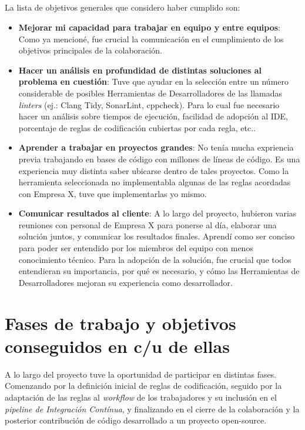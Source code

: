 \documentclass[12pt]{extreport} %
\begin{document}
\paragraph{}
La lista de objetivos generales que considero haber cumplido son:
\begin{itemize}
\item \textbf{Mejorar mi capacidad para trabajar en equipo y entre
  equipos}: Como ya mencioné, fue crucial la comunicación en el
  cumplimiento de los objetivos principales de la colaboración.
\item \textbf{Hacer un análisis en profundidad de distintas soluciones
  al problema en cuestión}: Tuve que ayudar en la selección entre un
  número considerable de posibles Herramientas de Desarrolladores de
  las llamadas \emph{linters} (ej.: Clang Tidy, SonarLint,
  cppcheck). Para lo cual fue necesario hacer un análisis sobre
  tiempos de ejecución, facilidad de adopción al IDE, porcentaje de
  reglas de codificación cubiertas por cada regla, etc..
\item \textbf{Aprender a trabajar en proyectos grandes}: No tenía
  mucha expriencia previa trabajando en bases de código con millones
  de líneas de código. Es una experiencia muy distinta saber ubicarse
  dentro de tales proyectos. Como la herramienta seleccionada no
  implementabla algunas de las reglas acordadas con Empresa X, tuve que
  implementarlas yo mismo.
\item \textbf{Comunicar resultados al cliente}: A lo largo del
  proyecto, hubieron varias reuniones con personal de Empresa X para
  ponerse al día, elaborar una solución juntos, y comunicar los
  resultados finales. Aprendí como ser conciso para poder ser
  entendido por los miembros del equipo con menos conocimiento
  técnico. Para la adopción de la solución, fue crucial que todos
  entendieran su importancia, por qué es necesario, y cómo las
  Herramientas de Desarrolladores mejoran su experiencia como
  desarrollador.
\end{itemize}


\chapter{Fases de trabajo y objetivos conseguidos en c/u de ellas}

A lo largo del proyecto tuve la oportunidad de participar en distintas
fases.  Comenzando por la definición inicial de reglas de
codificación, seguido por la adaptación de las reglas al
\emph{workflow} de los trabajadores y su inclusión en el
\emph{pipeline de Integración Contínua}, y finalizando en el cierre de
la colaboración y la posterior contribución de código desarrollado a
un proyecto open-source.
\end{document}
